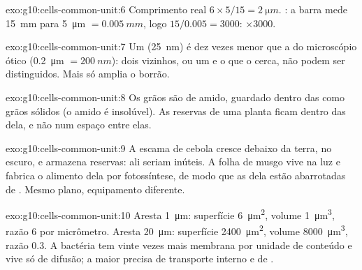 \begin{solution}{exo:g10:cells-common-unit:6}
Comprimento real $6 \times 5/15 = \qty{2}{\micro m}$. : a barra
mede \qty{15}{mm} para \qty{5}{\micro m} $= \qty{0.005}{mm}$, logo
$15/0.005 = 3000$: $\times 3000$.
\end{solution}

\begin{solution}{exo:g10:cells-common-unit:7}
Um  (\qty{25}{nm}) é dez vezes menor que a  do
microscópio ótico (\qty{0.2}{\micro m} $= \qty{200}{nm}$): dois
 vizinhos, ou um  e o que o cerca, não podem ser
distinguidos. Mais  só amplia o borrão.
\end{solution}

\begin{solution}{exo:g10:cells-common-unit:8}
Os grãos são de amido, guardado dentro das  como grãos sólidos
(o amido é insolúvel). As reservas de uma planta ficam dentro das
 dela, e não num espaço entre elas.
\end{solution}

\begin{solution}{exo:g10:cells-common-unit:9}
A escama de cebola cresce debaixo da terra, no escuro, e armazena
reservas:  ali seriam inúteis. A folha de musgo vive na luz
e fabrica o alimento dela por fotossíntese, de modo que as  dela
estão abarrotadas de . Mesmo plano, equipamento diferente.
\end{solution}

\begin{solution}{exo:g10:cells-common-unit:10}
Aresta \qty{1}{\micro m}: superfície \qty{6}{\micro m^2}, volume
\qty{1}{\micro m^3}, razão 6 por micrômetro. Aresta \qty{20}{\micro m}:
superfície \qty{2400}{\micro m^2}, volume \qty{8000}{\micro m^3}, razão
0.3. A bactéria tem vinte vezes mais membrana por unidade de conteúdo e
vive só de difusão; a  maior precisa de transporte interno e de
.
\end{solution}


